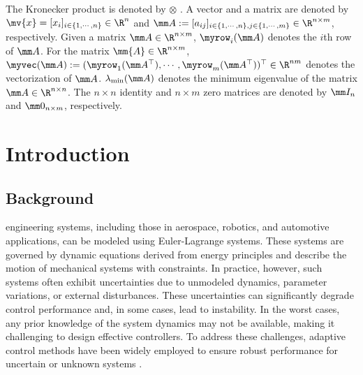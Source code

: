 \documentclass[letterpaper, journal]{IEEEtran}
\begin{document}
The Kronecker product is denoted by $\otimes$ \cite[Chap. 7, Def. 7.1.2]{Bernstein:2009aa}.
A vector and a matrix are denoted by $\mv{x}=[x_i]_{i\in\{1,\cdots,n\}}\in\R^n$ and $
\mm A
:= 
[a_{ij}]
_{
    i\in\{1,\cdots,n\},j\in\{1,\cdots ,m\}
}\allowbreak\in\R^{n\times m}
$, respectively.
Given a matrix $\mm A\in\R^{n\times m}$, $\myrow_i(\mm A)$ denotes the $i$th row of $\mm A$. 
For the matrix $\mm{A}\in\R^{n\times m}$, $\myvec(\mm A):=(\myrow_1(\mm A^\top),\cdots,\myrow_m(\mm A^\top) )^\top\in\R^{nm}$ denotes the vectorization of $\mm A$.
$\lambda_{\min}(\mm A)$ denotes the minimum eigenvalue of the matrix $\mm A\in\R^{n\times n}$.
The $n\times n$ identity and $n\times m$ zero matrices are denoted by $\mm I_n$ and $\mm 0_{n\times m}$, respectively.

\section{Introduction}

\subsection{Background}

 engineering systems, including those in aerospace, robotics, and automotive applications, can be modeled using Euler-Lagrange systems. 
These systems are governed by dynamic equations derived from energy principles and describe the motion of mechanical systems with constraints. 
In practice, however, such systems often exhibit uncertainties due to unmodeled dynamics, parameter variations, or external disturbances. 
These uncertainties can significantly degrade control performance and, in some cases, lead to instability. 
In the worst cases, any prior knowledge of the system dynamics may not be available, making it challenging to design effective controllers.
To address these challenges, adaptive control methods have been widely employed to ensure robust performance for uncertain or unknown systems \cite{Ioannou:2006aa, Tao:2003aa}.
\end{document}
